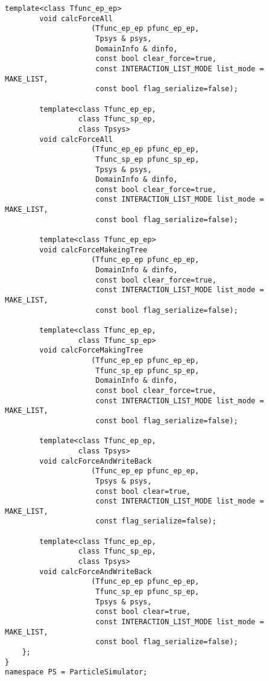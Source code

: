 \begin{lstlisting}[caption=TreeForForce1]
        template<class Tfunc_ep_ep>
        void calcForceAll
                    (Tfunc_ep_ep pfunc_ep_ep,
                     Tpsys & psys,
                     DomainInfo & dinfo,
                     const bool clear_force=true,
                     const INTERACTION_LIST_MODE list_mode = MAKE_LIST,
                     const bool flag_serialize=false);
                          
        template<class Tfunc_ep_ep,
                 class Tfunc_sp_ep,
                 class Tpsys>
        void calcForceAll
                    (Tfunc_ep_ep pfunc_ep_ep,
                     Tfunc_sp_ep pfunc_sp_ep,
                     Tpsys & psys,
                     DomainInfo & dinfo,
                     const bool clear_force=true,
                     const INTERACTION_LIST_MODE list_mode = MAKE_LIST,
                     const bool flag_serialize=false);

        template<class Tfunc_ep_ep>
        void calcForceMakeingTree
                    (Tfunc_ep_ep pfunc_ep_ep,
                     DomainInfo & dinfo,
                     const bool clear_force=true,
                     const INTERACTION_LIST_MODE list_mode = MAKE_LIST,
                     const bool flag_serialize=false);
                     
        template<class Tfunc_ep_ep,
                 class Tfunc_sp_ep>
        void calcForceMakingTree
                    (Tfunc_ep_ep pfunc_ep_ep,
                     Tfunc_sp_ep pfunc_sp_ep,
                     DomainInfo & dinfo,
                     const bool clear_force=true,
                     const INTERACTION_LIST_MODE list_mode = MAKE_LIST,
                     const bool flag_serialize=false);

        template<class Tfunc_ep_ep,
                 class Tpsys>
        void calcForceAndWriteBack
                    (Tfunc_ep_ep pfunc_ep_ep,
                     Tpsys & psys,
                     const bool clear=true,
                     const INTERACTION_LIST_MODE list_mode = MAKE_LIST,
                     const flag_serialize=false);
                     
        template<class Tfunc_ep_ep,
                 class Tfunc_sp_ep,
                 class Tpsys>
        void calcForceAndWriteBack
                    (Tfunc_ep_ep pfunc_ep_ep,
                     Tfunc_sp_ep pfunc_sp_ep,
                     Tpsys & psys,
                     const bool clear=true,
                     const INTERACTION_LIST_MODE list_mode = MAKE_LIST,
                     const bool flag_serialize=false);
    };
}
namespace PS = ParticleSimulator;
\end{lstlisting}

